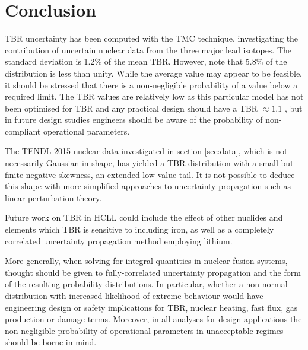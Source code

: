 \section{Conclusion}
TBR uncertainty has been computed with the TMC technique, investigating the contribution of uncertain nuclear data from the three major lead isotopes. The standard deviation is 1.2\% of the mean TBR. However, note that 5.8\% of the distribution is less than unity. While the average value may appear to be feasible, it should be stressed that there is a non-negligible probability of a value below a required limit. The TBR values are relatively low as this particular model has not been optimised for TBR and any practical design should have a TBR $\approx 1.1$ \cite{Fischer2015}, but in future design studies engineers should be aware of the probability of non-compliant operational parameters. 

The TENDL-2015 nuclear data investigated in section \ref{sec:data}, which is not necessarily Gaussian in shape, has yielded a TBR distribution with a small but finite negative skewness, an extended low-value tail. It is not possible to deduce this shape with more simplified approaches to uncertainty propagation such as linear perturbation theory.

Future work on TBR in HCLL could include the effect of other nuclides and elements which TBR is sensitive to including iron, as well as a completely correlated uncertainty propagation method employing lithium. 

More generally, when solving for integral quantities in nuclear fusion systems, thought should be given to fully-correlated uncertainty propagation and the form of the resulting probability distributions. In particular, whether a non-normal distribution with increased likelihood of extreme behaviour would have engineering design or safety implications for TBR, nuclear heating, fast flux, gas production or damage terms. Moreover, in all analyses for design applications the non-negligible probability of operational parameters in unacceptable regimes should be borne in mind.

